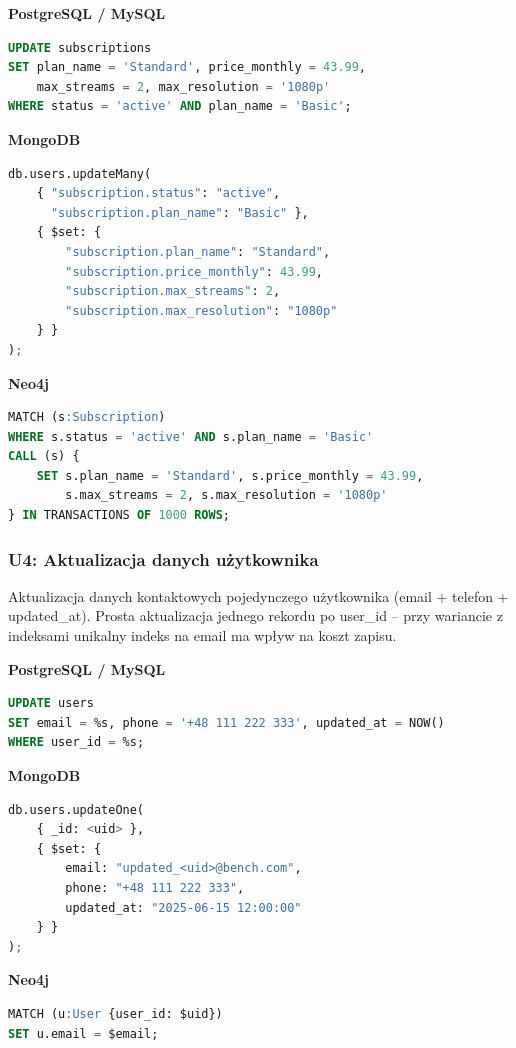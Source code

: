 \textbf{PostgreSQL / MySQL}
\begin{lstlisting}[language=SQL]
UPDATE subscriptions
SET plan_name = 'Standard', price_monthly = 43.99,
    max_streams = 2, max_resolution = '1080p'
WHERE status = 'active' AND plan_name = 'Basic';
\end{lstlisting}

\textbf{MongoDB}
\begin{lstlisting}[language=Python]
db.users.updateMany(
    { "subscription.status": "active",
      "subscription.plan_name": "Basic" },
    { $set: {
        "subscription.plan_name": "Standard",
        "subscription.price_monthly": 43.99,
        "subscription.max_streams": 2,
        "subscription.max_resolution": "1080p"
    } }
);
\end{lstlisting}

\textbf{Neo4j}
\begin{lstlisting}[language=SQL]
MATCH (s:Subscription)
WHERE s.status = 'active' AND s.plan_name = 'Basic'
CALL (s) {
    SET s.plan_name = 'Standard', s.price_monthly = 43.99,
        s.max_streams = 2, s.max_resolution = '1080p'
} IN TRANSACTIONS OF 1000 ROWS;
\end{lstlisting}


\subsubsection{U4: Aktualizacja danych użytkownika}

Aktualizacja danych kontaktowych pojedynczego użytkownika (email + telefon +
updated\_at). Prosta aktualizacja jednego rekordu po user\_id -- przy wariancie z indeksami
unikalny indeks na email ma wpływ na koszt zapisu.

\textbf{PostgreSQL / MySQL}
\begin{lstlisting}[language=SQL]
UPDATE users
SET email = %s, phone = '+48 111 222 333', updated_at = NOW()
WHERE user_id = %s;
\end{lstlisting}

\textbf{MongoDB}
\begin{lstlisting}[language=Python]
db.users.updateOne(
    { _id: <uid> },
    { $set: {
        email: "updated_<uid>@bench.com",
        phone: "+48 111 222 333",
        updated_at: "2025-06-15 12:00:00"
    } }
);
\end{lstlisting}

\textbf{Neo4j}
\begin{lstlisting}[language=SQL]
MATCH (u:User {user_id: $uid})
SET u.email = $email;
\end{lstlisting}


